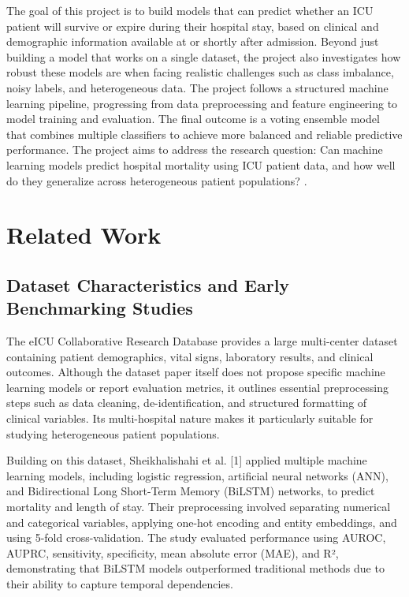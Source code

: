 \documentclass[11pt]{article}
\begin{document}
The goal of this project is to build models that can predict whether an ICU patient will survive or expire during their hospital stay, based on clinical and demographic information available at or shortly after admission. Beyond just building a model that works on a single dataset, the project also investigates how robust these models are when facing realistic challenges such as class imbalance, noisy labels, and heterogeneous data.
The project follows a structured machine learning pipeline, progressing from data preprocessing and feature engineering to model training and evaluation. The final outcome is a voting ensemble model that combines multiple classifiers to achieve more balanced and reliable predictive performance.
The project aims to address the research question: Can machine learning models predict hospital mortality using ICU patient data, and how well do they generalize across heterogeneous patient populations? .

\section{Related Work}

\subsection{Dataset Characteristics and Early Benchmarking Studies
}
The eICU Collaborative Research Database provides a large multi-center dataset containing patient demographics, vital signs, laboratory results, and clinical outcomes. Although the dataset paper itself does not propose specific machine learning models or report evaluation metrics, it outlines essential preprocessing steps such as data cleaning, de-identification, and structured formatting of clinical variables. Its multi-hospital nature makes it particularly suitable for studying heterogeneous patient populations.

Building on this dataset, Sheikhalishahi et al. [1] applied multiple machine learning models, including logistic regression, artificial neural networks (ANN), and Bidirectional Long Short-Term Memory (BiLSTM) networks, to predict mortality and length of stay. Their preprocessing involved separating numerical and categorical variables, applying one-hot encoding and entity embeddings, and using 5-fold cross-validation. The study evaluated performance using AUROC, AUPRC, sensitivity, specificity, mean absolute error (MAE), and R², demonstrating that BiLSTM models outperformed traditional methods due to their ability to capture temporal dependencies.
\end{document}

